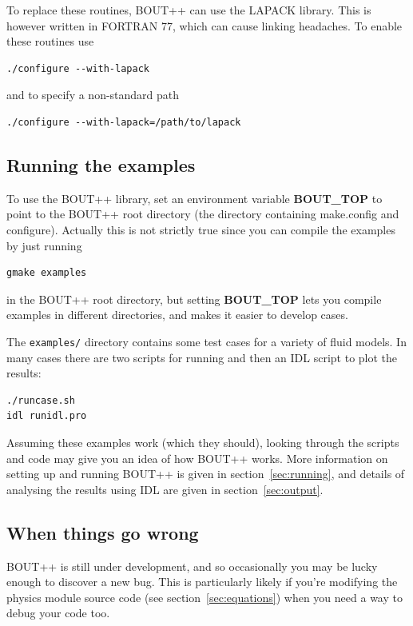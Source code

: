 \documentclass[12pt]{article}
\begin{document}
To replace these routines, BOUT++ can use the LAPACK library. This is
however written in FORTRAN 77, which can cause linking headaches.
To enable these routines use
\begin{verbatim}
./configure --with-lapack
\end{verbatim}
and to specify a non-standard path
\begin{verbatim}
./configure --with-lapack=/path/to/lapack
\end{verbatim}

\subsection{Running the examples}
\label{sec:runexamples}

To use the BOUT++ library, set an environment variable {\bf BOUT\_TOP} to point to the BOUT++ root
directory (the directory containing make.config and configure). Actually this is not strictly true since
you can compile the examples by just running
\begin{verbatim}
gmake examples
\end{verbatim}
in the BOUT++ root directory, but setting {\bf BOUT\_TOP} lets you compile examples in different
directories, and makes it easier to develop cases.

The \texttt{examples/} directory contains some test cases for a variety of fluid models. In many cases
there are two scripts for running and then an IDL script to plot the results:
\begin{verbatim}
./runcase.sh
idl runidl.pro
\end{verbatim}

Assuming these examples work (which they should), looking through the scripts and code
may give you an idea of how BOUT++ works. More information on setting up and running BOUT++ is given
in section~\ref{sec:running}, and details of analysing the results using IDL are given in
section~\ref{sec:output}.

\subsection{When things go wrong}

BOUT++ is still under development, and so occasionally you may be lucky
enough to discover a new bug. This is particularly likely if you're modifying
the physics module source code (see section~\ref{sec:equations}) when you
need a way to debug your code too.
\end{document}
